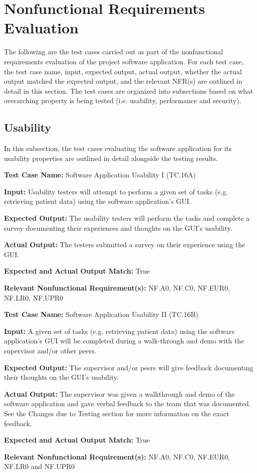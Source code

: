 \documentclass[12pt, titlepage]{article}
\begin{document}
\section{Nonfunctional Requirements Evaluation}
The following are the test cases carried out as part of the nonfunctional requirements evaluation of the project software application. For each test case, the test case name, input, expected output, actual output, whether the actual output matched the expected output, and the relevant NFR(s) are outlined in detail in this section. The test cases are organized into subsections based on what overarching property is being tested (i.e. usability, performance and security).

\subsection{Usability}
In this subsection, the test cases evaluating the software application for its usability properties are outlined in detail alongside the testing results. \\

\begin{mdframed}[linewidth=0.5mm]
  \textbf{Test Case Name:} Software Application Usability I (TC.16A) \par
  \textbf{Input:} Usability testers will attempt to perform a given set of tasks (e.g. retrieving patient data) using the software application's GUI. \par
  \textbf{Expected Output:} The usability testers will perform the tasks and complete a survey documenting their experiences and thoughts on the GUI's usability. \par
  \textbf{Actual Output:} The testers submitted a survey on their experience using the GUI. \par
  \textbf{Expected and Actual Output Match:} True \par
  \textbf{Relevant Nonfunctional Requirement(s):} NF.A0, NF.C0, NF.EUR0, NF.LR0, NF.UPR0
\end{mdframed}

\begin{mdframed}[linewidth=0.5mm]
  \textbf{Test Case Name:} Software Application Usability II (TC.16B) \par
  \textbf{Input:} A given set of tasks (e.g. retrieving patient data) using the software application's GUI will be completed during a walk-through and demo with the supervisor and/or other peers. \par
  \textbf{Expected Output:} The supervisor and/or peers will give feedback documenting their thoughts on the GUI's usability. \par
  \textbf{Actual Output:} The supervisor was given a walkthrough and demo of the software application and gave verbal feedback to the team that was documented. See the Changes due to Testing section for more information on the exact feedback. \par
  \textbf{Expected and Actual Output Match:} True \par
  \textbf{Relevant Nonfunctional Requirement(s):} NF.A0, NF.C0, NF.EUR0, NF.LR0 and NF.UPR0
\end{mdframed}
    
\end{document}
